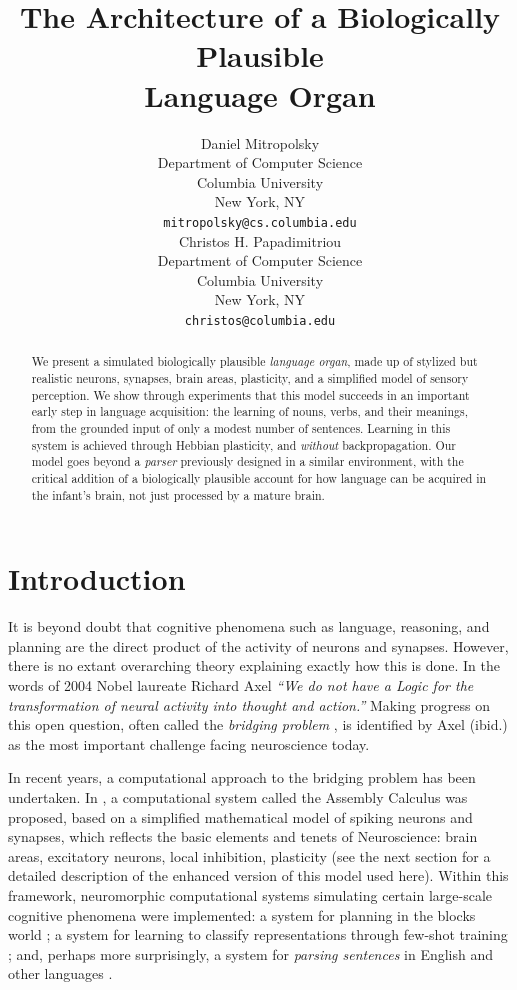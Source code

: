 \documentclass{article}
\title{The Architecture of a Biologically Plausible \\
Language Organ}
\author{%
  Daniel Mitropolsky \\
  Department of Computer Science\\
  Columbia University\\
  New York, NY \\
  \texttt{mitropolsky@cs.columbia.edu} \\
  \And
  Christos H. Papadimitriou \\
  Department of Computer Science\\
  Columbia University\\
  New York, NY \\
  \texttt{christos@columbia.edu} \\
}
\begin{document}
\maketitle


\begin{abstract}
 We present a simulated biologically plausible \emph{language organ}, made up of stylized but realistic neurons, synapses, brain areas, plasticity, and a simplified model of sensory perception.  We show through experiments that this model succeeds in an important early step in language acquisition: the learning of nouns, verbs, and their meanings, from the grounded input of only a modest number of sentences. Learning in this system is achieved through Hebbian plasticity, and \emph{without} backpropagation. Our model goes beyond a {\em parser} previously designed in a similar environment, with the critical addition of a biologically plausible account for how language can be acquired in the infant's brain, not just processed by a mature brain. %
\end{abstract}


\section{Introduction}
It is beyond doubt that cognitive phenomena such as language, reasoning, and planning are the direct product of the activity of neurons and synapses.  However, there is no extant overarching theory explaining exactly how this is done.  %
In the words of 2004 Nobel laureate Richard Axel \citep{AxelNeuron2018} \emph{``We do not have a Logic for the transformation of neural activity into thought and action.''}   Making progress on this open question, often called the \emph{bridging problem} \citep{PapadimitriouFriederici}, is identified by Axel (ibid.) as the most important challenge facing neuroscience today.  

In recent years, a computational approach to the bridging problem has been undertaken. In \citep{PNAS}, a computational system called the Assembly Calculus was proposed, based on a simplified mathematical model of spiking neurons and synapses, which reflects the basic elements and tenets of Neuroscience: brain areas, excitatory neurons, local inhibition, plasticity (see the next section for a detailed description of the enhanced version of this model used here). Within this framework, neuromorphic computational systems simulating certain large-scale cognitive phenomena were implemented: a system for planning in the blocks world \citep{Planning}; a system for learning to classify representations through few-shot training \citep{Dabagia}; and, perhaps more surprisingly, a system for \emph{parsing sentences} in English and other languages \citep{Parser,CenterEmbedding}. 
\end{document}
